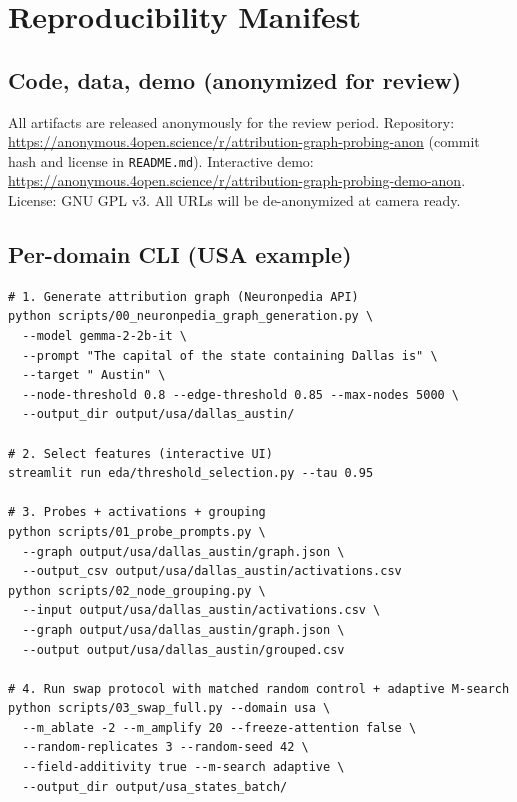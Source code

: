 \section{Reproducibility Manifest}
\label{appx:repro}

\subsection{Code, data, demo (anonymized for review)}
All artifacts are released anonymously for the review period. Repository: \url{https://anonymous.4open.science/r/attribution-graph-probing-anon} (commit hash and license in \texttt{README.md}). Interactive demo: \url{https://anonymous.4open.science/r/attribution-graph-probing-demo-anon}. License: GNU GPL v3. All URLs will be de-anonymized at camera ready.

\subsection{Per-domain CLI (USA example)}
\begin{small}
\begin{verbatim}
# 1. Generate attribution graph (Neuronpedia API)
python scripts/00_neuronpedia_graph_generation.py \
  --model gemma-2-2b-it \
  --prompt "The capital of the state containing Dallas is" \
  --target " Austin" \
  --node-threshold 0.8 --edge-threshold 0.85 --max-nodes 5000 \
  --output_dir output/usa/dallas_austin/

# 2. Select features (interactive UI)
streamlit run eda/threshold_selection.py --tau 0.95

# 3. Probes + activations + grouping
python scripts/01_probe_prompts.py \
  --graph output/usa/dallas_austin/graph.json \
  --output_csv output/usa/dallas_austin/activations.csv
python scripts/02_node_grouping.py \
  --input output/usa/dallas_austin/activations.csv \
  --graph output/usa/dallas_austin/graph.json \
  --output output/usa/dallas_austin/grouped.csv

# 4. Run swap protocol with matched random control + adaptive M-search
python scripts/03_swap_full.py --domain usa \
  --m_ablate -2 --m_amplify 20 --freeze-attention false \
  --random-replicates 3 --random-seed 42 \
  --field-additivity true --m-search adaptive \
  --output_dir output/usa_states_batch/
\end{verbatim}
\end{small}


